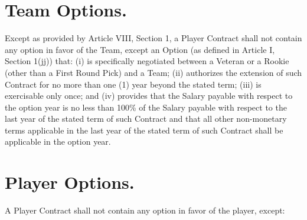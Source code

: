 \documentclass[
]{book}
\begin{document}
\hypertarget{team-options.}{%
\section{Team Options.}\label{team-options.}}

Except as provided by Article VIII, Section 1, a Player Contract shall not contain any option in favor of the Team, except an Option (as defined in Article I, Section 1(jj)) that: (i) is specifically negotiated between a Veteran or a Rookie (other than a First Round Pick) and a Team; (ii) authorizes the extension of such Contract for no more than one (1) year beyond the stated term; (iii) is exercisable only once; and (iv) provides that the Salary payable with respect to the option year is no less than 100\% of the Salary payable with respect to the last year of the stated term of such Contract and that all other non-monetary terms applicable in the last year of the stated term of such Contract shall be applicable in the option year.

\hypertarget{player-options.}{%
\section{Player Options.}\label{player-options.}}

A Player Contract shall not contain any option in favor of the player, except:
\end{document}
